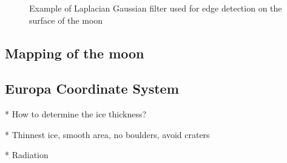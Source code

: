 \begin{figure}[htb]
{	}
	\captionsetup{width=.9\textwidth}
	\caption{Example of Laplacian Gaussian filter used for edge detection on the surface of the moon}
	\label{fig:edge_detection}
\end{figure}

\subsection{Mapping of the moon}

\subsection{Europa Coordinate System}

* How to determine the ice thickness?

* Thinnest ice, smooth area, no boulders, avoid craters

* Radiation

